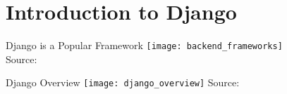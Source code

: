 \section{Introduction to Django}


\begin{frame}[c]{Django is a Popular Framework}
    \texttt{[image: backend\_frameworks]} \\
    Source: \cite{frameworks}
\end{frame}


\begin{frame}[c]{Django Overview}
    \texttt{[image: django\_overview]}
    Source: \cite{overview}
\end{frame}



% 
% 

